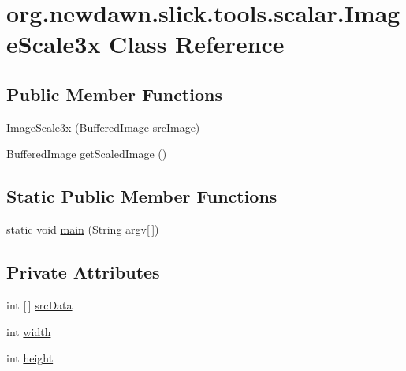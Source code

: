 \hypertarget{classorg_1_1newdawn_1_1slick_1_1tools_1_1scalar_1_1_image_scale3x}{}\section{org.\+newdawn.\+slick.\+tools.\+scalar.\+Image\+Scale3x Class Reference}
\label{classorg_1_1newdawn_1_1slick_1_1tools_1_1scalar_1_1_image_scale3x}
\subsection*{Public Member Functions}
\begin{DoxyCompactItemize}
\item 
\mbox{\hyperlink{classorg_1_1newdawn_1_1slick_1_1tools_1_1scalar_1_1_image_scale3x_ae271f29b00010fb6c4f20ba00ca58461}{Image\+Scale3x}} (Buffered\+Image src\+Image)
\item 
Buffered\+Image \mbox{\hyperlink{classorg_1_1newdawn_1_1slick_1_1tools_1_1scalar_1_1_image_scale3x_a92db926ee3010c6cb98f2ee8f8b7b331}{get\+Scaled\+Image}} ()
\end{DoxyCompactItemize}
\subsection*{Static Public Member Functions}
\begin{DoxyCompactItemize}
\item 
static void \mbox{\hyperlink{classorg_1_1newdawn_1_1slick_1_1tools_1_1scalar_1_1_image_scale3x_ac3c4f4de3ff2d753522089e404ea86ed}{main}} (String argv\mbox{[}$\,$\mbox{]})
\end{DoxyCompactItemize}
\subsection*{Private Attributes}
\begin{DoxyCompactItemize}
\item 
int \mbox{[}$\,$\mbox{]} \mbox{\hyperlink{classorg_1_1newdawn_1_1slick_1_1tools_1_1scalar_1_1_image_scale3x_ae5b333101bdebea500fe86161c247eba}{src\+Data}}
\item 
int \mbox{\hyperlink{classorg_1_1newdawn_1_1slick_1_1tools_1_1scalar_1_1_image_scale3x_a231fbd1dc91babe221fcce1c82d63155}{width}}
\item 
int \mbox{\hyperlink{classorg_1_1newdawn_1_1slick_1_1tools_1_1scalar_1_1_image_scale3x_ac2833ff5d8ce6679fed6cbe64efdb5d8}{height}}
\end{DoxyCompactItemize}



